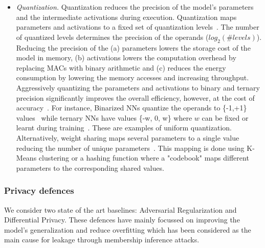 \begin{itemize}[leftmargin=*]
\item {\em Quantization.}
Quantization reduces the precision of the model's parameters and the intermediate activations during execution.
Quantization maps parameters and activations to a fixed set of quantization levels~\cite{Hubara:2017:QNN:3122009.3242044}.
The number of quantized levels determines the precision of the operands ($log_2(\#levels)$).
Reducing the precision of the (a) parameters lowers the storage cost of the model in memory, (b) activations lowers the computation overhead by replacing MACs with binary arithmetic and (c) reduces the energy consumption by lowering the memory accesses and increasing throughput.
Aggressively quantizing the parameters and activations to binary and ternary precision significantly improves the overall efficiency, however, at the cost of accuracy~\cite{rastegari2016xnornet}.
For instance, Binarized NNs quantize the operands to \{-1,+1\} values~\cite{NIPS2016_6573} while ternary NNs have values \{-w, 0, w\} where $w$ can be fixed or learnt during training~\cite{Li2016TernaryWN}. These are examples of uniform quantization.
Alternatively, weight sharing maps several parameters to a single value reducing the number of unique parameters~\cite{DBLP:journals/corr/HanMD15}.
This mapping is done using K-Means clustering or a hashing function where a "codebook" maps different parameters to the corresponding shared values.

\end{itemize}


\subsubsection{Privacy defences}


We consider two state of the art baselines: Adversarial Regularization and Differential Privacy.
These defences have mainly focussed on improving the model's generalization and reduce overfitting which has been considered as the main cause for leakage through membership inference attacks.

